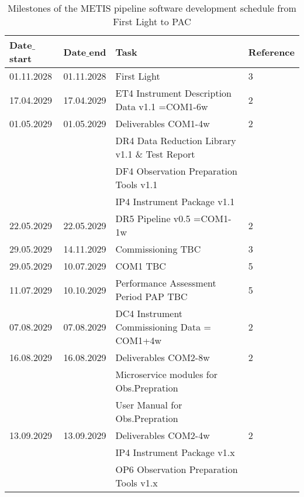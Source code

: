 \begin{table}[h!]
    \caption[Development schedule]{Milestones of the METIS pipeline software development schedule from First Light to PAC}
  \label{tab:development_schedule2}

\centering
\scriptsize
\begin{tabularx}{\textwidth}{llll}

\hline
Date$\_$start &	Date$\_$end   &	Task                            &		Reference \\
\hline\hline


01.11.2028 & 01.11.2028 & First Light 						                  &	3 \\
\hline
17.04.2029 & 17.04.2029 & ET4 Instrument Description Data v1.1 =COM1-6w		  &	2 \\
\hline
01.05.2029 & 01.05.2029 & Deliverables COM1-4w                                &	2 \\
    &          & DR4 Data Reduction Library v1.1 \& Test Report               &	\\
    &	  	   & DF4 Observation Preparation Tools v1.1                       &	\\
    &		   & IP4 Instrument Package v1.1				                  &	\\
\hline
22.05.2029 & 22.05.2029 & DR5 Pipeline v0.5 =COM1-1w				        &	2 \\
\hline 
29.05.2029 & 14.11.2029 & Commissioning TBC					                &	3 \\
\hline
29.05.2029 & 10.07.2029 & COM1 TBC						                    &	5 \\
\hline
11.07.2029 & 10.10.2029 & Performance Assessment Period PAP TBC			    &	5 \\
\hline
07.08.2029 & 07.08.2029 & DC4 Instrument Commissioning Data = COM1+4w		&   2 \\
\hline
16.08.2029 & 16.08.2029 & Deliverables COM2-8w                              &	2 \\
    &          & Microservice modules for Obs.Prepration                    &	\\
    &		   & User Manual for Obs.Prepration				                &	\\
\hline
13.09.2029 & 13.09.2029 & Deliverables COM2-4w                              & 	2 \\
    &          & IP4 Instrument Package v1.x                                &	\\
    &	       & OP6 Observation Preparation Tools v1.x                     &	\\

\end{tabularx}
\end{table}
